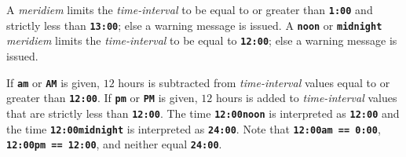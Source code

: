 \documentclass[12pt]{article}
\newcommand{\TT}[1]{{\tt \bfseries #1}}
\newlength{\figurewidth}
\newenvironment{boxedfigure}[1][!btp]%
	{\begin{figure*}[#1]
	 \begin{lrbox}{\figurebox}
	 \begin{minipage}{\figurewidth}

	 \vspace*{1ex}}%
	{
	 \vspace*{1ex}

	 \end{minipage}
	 \end{lrbox}
	 \begin{center}
	 \fbox{\hspace*{0.1in}\usebox{\figurebox}\hspace*{0.1in}}
	 \end{center}
	 \end{figure*}}
\begin{document}
A {\em meridiem} limits the {\em time-interval}
to be equal to or greater than \TT{1:00} and strictly less than
\TT{13:00}; else a warning message is issued.  A \TT{noon}
or \TT{midnight} {\em meridiem} limits the {\em time-interval}
to be equal to \TT{12:00}; else a warning message is issued.

If \TT{am} or \TT{AM} is given, $12$ hours is subtracted from
{\em time-interval} values equal to or greater than \TT{12:00}.
If \TT{pm} or \TT{PM} is given, $12$ hours is added to
{\em time-interval} values that are strictly less than \TT{12:00}.
The time \TT{12:00noon} is interpreted as \TT{12:00} and
the time \TT{12:00midnight} is interpreted as \TT{24:00}.
Note that \TT{12:00am == 0:00}, \TT{12:00pm == 12:00}, and neither
equal \TT{24:00}.

\begin{boxedfigure}[t]

\footnotesize


\end{boxedfigure}
\end{document}
